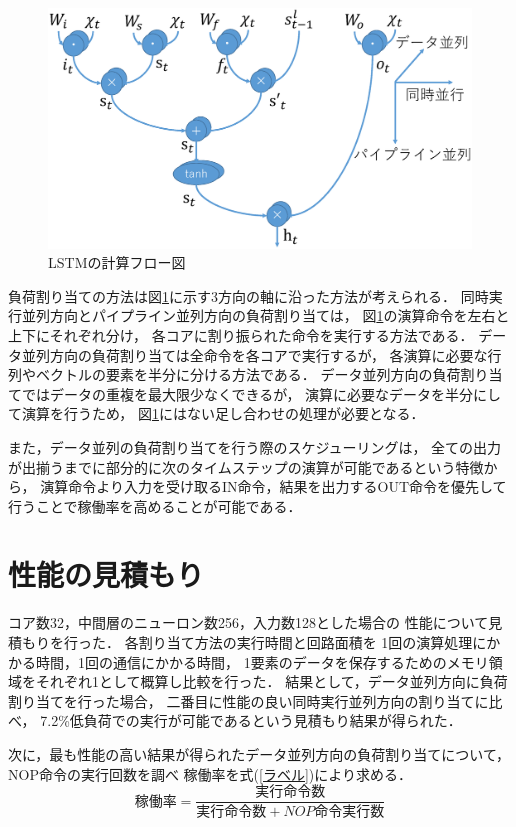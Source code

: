 \documentclass[a4j]{jarticle}
\begin{document}
\begin{Abstract}
 \begin{figure}[h]
  \centering
  \includegraphics[scale=0.25]{flow.eps}
  \caption{LSTMの計算フロー図}
  \label{フロー図}
 \end{figure}
負荷割り当ての方法は図\ref{フロー図}に示す3方向の軸に沿った方法が考えられる．
同時実行並列方向とパイプライン並列方向の負荷割り当ては，
図\ref{フロー図}の演算命令を左右と上下にそれぞれ分け，
各コアに割り振られた命令を実行する方法である．
データ並列方向の負荷割り当ては全命令を各コアで実行するが，
各演算に必要な行列やベクトルの要素を半分に分ける方法である．
データ並列方向の負荷割り当てではデータの重複を最大限少なくできるが，
演算に必要なデータを半分にして演算を行うため，
図\ref{フロー図}にはない足し合わせの処理が必要となる．

また，データ並列の負荷割り当てを行う際のスケジューリングは，
全ての出力が出揃うまでに部分的に次のタイムステップの演算が可能であるという特徴から，
演算命令より入力を受け取るIN命令，結果を出力するOUT命令を優先して行うことで稼働率を高めることが可能である．

 \section{性能の見積もり}
 コア数32，中間層のニューロン数256，入力数128とした場合の
 性能について見積もりを行った．
 各割り当て方法の実行時間と回路面積を
 1回の演算処理にかかる時間，1回の通信にかかる時間，
 1要素のデータを保存するためのメモリ領域をそれぞれ1として概算し比較を行った．
 結果として，データ並列方向に負荷割り当てを行った場合，
 二番目に性能の良い同時実行並列方向の割り当てに比べ，
 7.2\%低負荷での実行が可能であるという見積もり結果が得られた．

次に，最も性能の高い結果が得られたデータ並列方向の負荷割り当てについて，
NOP命令の実行回数を調べ
稼働率を式(\ref{ラベル})により求める．
\begin{equation}
  稼働率 = \frac{実行命令数}{実行命令数+NOP命令実行数}
  \label{ラベル}
\end{equation}


\end{Abstract}
\end{document}
